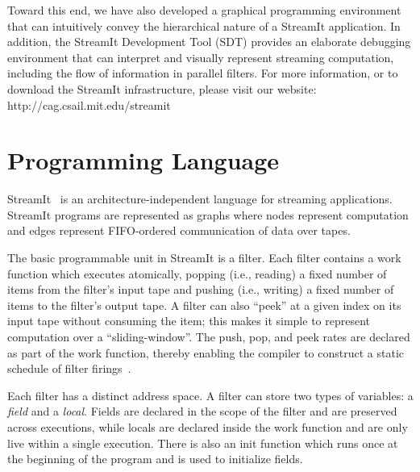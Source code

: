 \documentclass[11pt, letterpaper, onecolumn]{article}
\begin{document}
 Toward this end, we have
also developed a graphical programming environment that can
intuitively convey the hierarchical nature of a StreamIt
application. In addition, the StreamIt Development Tool (SDT) provides
an elaborate debugging environment that can interpret and visually
represent streaming computation, including the flow of information in
parallel filters. For more information, or to download the StreamIt
infrastructure, please visit our website:
http://cag.csail.mit.edu/streamit



\section{Programming Language}
\label{sec:pl}

StreamIt~\cite{streamitcc} is an architecture-independent language for
streaming applications.   StreamIt programs are  represented as graphs
where  nodes represent  computation and  edges  represent FIFO-ordered
communication  of data  over tapes.  

The  basic programmable  unit in  StreamIt is  a filter.   Each filter
contains  a work  function which  executes atomically,  popping (i.e.,
reading)  a fixed number  of items  from the  filter's input  tape and
pushing (i.e., writing) a fixed number of items to the filter's output
tape.  A filter  can also ``peek'' at a given index  on its input tape
without  consuming  the  item;  this  makes  it  simple  to  represent
computation over a ``sliding-window''.   The push, pop, and peek rates
are  declared as  part  of  the work  function,  thereby enabling  the
compiler    to    construct    a    static    schedule    of    filter
firings~\cite{lee87static}.

Each filter has a distinct address space.  A filter can store two
types of variables: a {\it field} and a {\it local}.  Fields are
declared in the scope of the filter and are preserved across
executions, while locals are declared inside the work function and are
only live within a single execution.  There is also an init function
which runs once at the beginning of the program and is used to
initialize fields.
\end{document}
